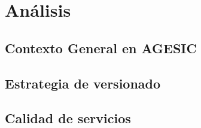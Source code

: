 \chapter{Análisis}
\label{Analisis}

\section{Contexto General en AGESIC}
\label{Analisis:ContextoAgesic}

\section{Estrategia de versionado}
\label{Analisis:EstrategiaVersionado}

\section{Calidad de servicios}
\label{Analisis:CalidadServicios}
